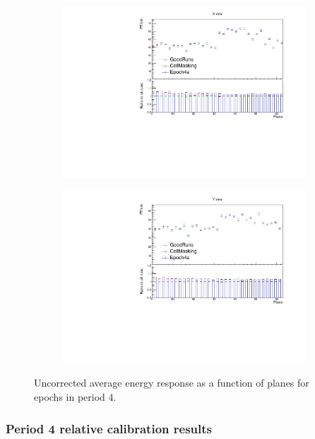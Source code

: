 \documentclass[12pt,a4paper]{article}
\begin{document}
\begin{figure}[!hbtp]
\centering
\begin{subfigure}[b]{0.495\textwidth}
\centering
\includegraphics[width=\textwidth]{Plots/Attenprofs_P4Data_PlanePE_X_Combined.pdf}
\end{subfigure}
\begin{subfigure}[b]{0.495\textwidth}
\centering
\includegraphics[width=\textwidth]{Plots/Attenprofs_P4Data_PlanePE_Y_Combined.pdf}
\end{subfigure}
\caption{Uncorrected average energy response as a function of planes for epochs in period 4.}
\label{figCalibhistPlanePE_period4}
\end{figure}

\subsubsection*{Period 4 relative calibration results}
\end{document}

